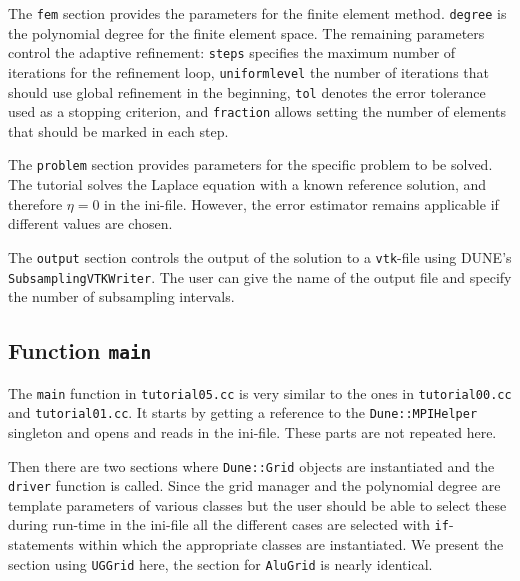 \documentclass[a4paper,12pt]{article}
\begin{document}

The \lstinline{fem} section provides the parameters for the finite element method.
\lstinline{degree} is the polynomial degree for the finite element space. The remaining
parameters control the adaptive refinement: \lstinline{steps} specifies the maximum number of
iterations for the refinement loop, \lstinline{uniformlevel} the number of iterations that
should use global refinement in the beginning, \lstinline{tol} denotes the error tolerance
used as a stopping criterion, and \lstinline{fraction} allows setting the number of elements that
should be marked in each step.


The \lstinline{problem} section provides parameters for the specific problem to be solved. The
tutorial solves the Laplace equation with a known reference solution, and therefore $\eta = 0$ in
the ini-file. However, the error estimator remains applicable if different values are chosen.


The \lstinline{output} section controls the output of the solution
to a \lstinline{vtk}-file using DUNE's \lstinline{SubsamplingVTKWriter}.
The user can give the name of the output file and specify the number of subsampling intervals.

\subsection{Function \lstinline{main}}

The \lstinline{main} function  in \lstinline{tutorial05.cc} is very similar to the ones
in \lstinline{tutorial00.cc} and \lstinline{tutorial01.cc}. It starts by getting a reference
to the \lstinline{Dune::MPIHelper} singleton and opens and reads in the ini-file.
These parts are not repeated here.

Then there are two sections where \lstinline{Dune::Grid} objects are instantiated
and the \lstinline{driver} function is called. Since the grid manager
and the polynomial degree are template parameters of various classes
but the user should be able to select these during run-time in the ini-file all
the different cases are selected with \lstinline{if}-statements within which
the appropriate classes are instantiated. We present the section using
\lstinline{UGGrid} here, the section for \lstinline{AluGrid} is nearly identical.
\end{document}

